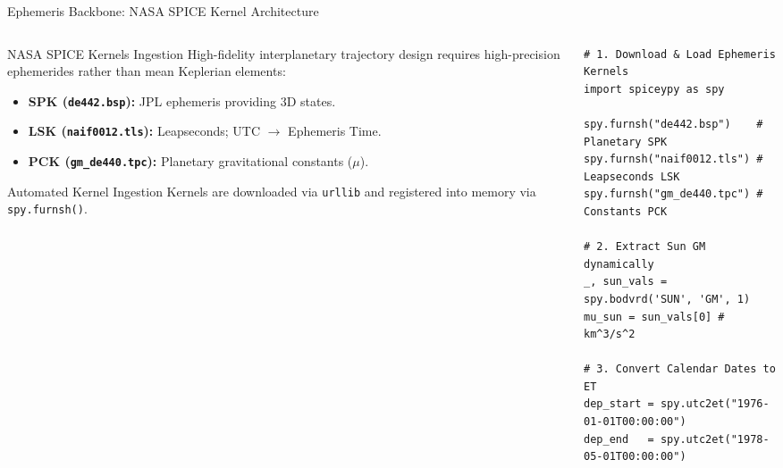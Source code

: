 \documentclass[aspectratio=169, 10pt]{beamer}
\begin{document}
\begin{frame}[fragile]{Ephemeris Backbone: NASA SPICE Kernel Architecture}
    \begin{columns}[t]
        \begin{column}{0.54\textwidth}
            \begin{block}{NASA SPICE Kernels Ingestion}
                \scriptsize
                High-fidelity interplanetary trajectory design requires high-precision ephemerides rather than mean Keplerian elements:
                \begin{itemize}\setlength{\itemsep}{1.5pt}
                    \item \textbf{SPK (\texttt{de442.bsp}):} JPL ephemeris providing 3D states.
                    \item \textbf{LSK (\texttt{naif0012.tls}):} Leapseconds; UTC $\to$ Ephemeris Time.
                    \item \textbf{PCK (\texttt{gm\_de440.tpc}):} Planetary gravitational constants ($\mu$).
                \end{itemize}
            \end{block}
            \vspace{-0.1cm}
            \begin{exampleblock}{Automated Kernel Ingestion}
                \scriptsize
                Kernels are downloaded via \texttt{urllib} and registered into memory via \texttt{spy.furnsh()}.
            \end{exampleblock}
        \end{column}

        \begin{column}{0.44\textwidth}
\begin{lstlisting}[style=pythoncode]
# 1. Download & Load Ephemeris Kernels
import spiceypy as spy

spy.furnsh("de442.bsp")    # Planetary SPK
spy.furnsh("naif0012.tls") # Leapseconds LSK
spy.furnsh("gm_de440.tpc") # Constants PCK

# 2. Extract Sun GM dynamically
_, sun_vals = spy.bodvrd('SUN', 'GM', 1)
mu_sun = sun_vals[0] # km^3/s^2

# 3. Convert Calendar Dates to ET
dep_start = spy.utc2et("1976-01-01T00:00:00")
dep_end   = spy.utc2et("1978-05-01T00:00:00")
\end{lstlisting}
        \end{column}
    \end{columns}
\end{frame}
\end{document}
